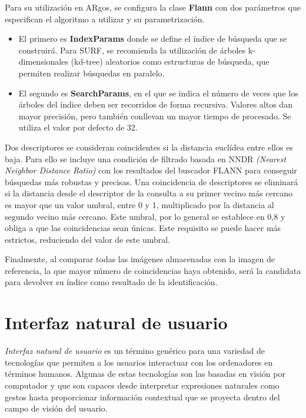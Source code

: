 Para su utilización en ARgos, se configura la clase \textbf{Flann}
con dos parámetros que especifican el algoritmo a utilizar y su parametrización.

\begin{itemize}
\item El primero es \textbf{IndexParams} donde se define el índice de búsqueda
que se construirá. Para SURF, se recomienda la utilización de árboles
k-dimensionales (kd-tree) aleatorios como estructuras de búsqueda, que
permiten realizar búsquedas en paralelo.

\item El segundo es \textbf{SearchParams}, en el que se indica el número de
veces que los árboles del índice deben ser recorridos de forma
recursiva. Valores altos dan mayor precisión, pero también conllevan
un mayor tiempo de procesado. Se utiliza el valor por defecto de 32.
\end{itemize}

Dos descriptores se consideran coincidentes si la distancia euclídea
entre ellos es baja. Para ello se incluye una condición de filtrado
basada en NNDR \emph{(Nearest Neighbor Distance Ratio)} con los resultados
del buscador FLANN para conseguir búsquedas más robustas y
precisas. Una coincidencia de descriptores se eliminará si la
distancia desde el descriptor de la consulta a su primer vecino más
cercano es mayor que un valor umbral, entre 0 y 1, multiplicado por la
distancia al segundo vecino más cercano. Este umbral, por lo general
se establece en 0,8 y obliga a que las coincidencias sean únicas. Este
requisito se puede hacer más estrictos, reduciendo del valor de este
umbral.

Finalmente, al comparar todas las imágenes almacenadas con la imagen
de referencia, la que mayor número de coincidencias haya obtenido, será
la candidata para devolver su índice como resultado de la identificación.


\section{Interfaz natural de usuario}

\emph{Interfaz natural de usuario} es un término genérico para una variedad de tecnologías que
permiten a los usuarios interactuar con los ordenadores en términos humanos. Algunas de
estas tecnologías son las basadas en visión por computador y que son
capaces desde interpretar expresiones naturales como gestos hasta proporcionar información contextual que se
proyecta dentro del campo de visión del usuario.

